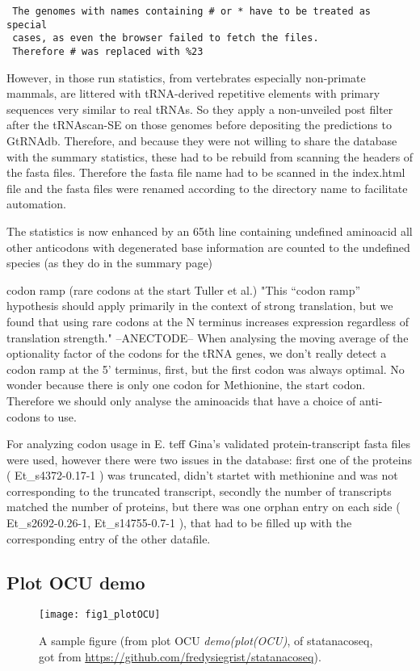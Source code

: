 \begin{verbatim}
 The genomes with names containing # or * have to be treated as special 
 cases, as even the browser failed to fetch the files. 
 Therefore # was replaced with %23
\end{verbatim}

However, in those run statistics, from vertebrates especially non-primate mammals, are littered with tRNA-derived repetitive elements with primary sequences very similar to real tRNAs. So they apply a non-unveiled post filter after the tRNAscan-SE on those genomes before depositing the predictions to GtRNAdb. Therefore, and because they were not willing to share the database with the summary statistics, these had to be rebuild from scanning the headers of the fasta files. Therefore the fasta file name had to be scanned in the index.html file and the fasta files were renamed according to the directory name to facilitate automation. 

The statistics is now enhanced by an 65th line containing undefined aminoacid all other anticodons with degenerated base information are counted to the undefined species (as they do in the summary page)

codon ramp (rare codons at the start Tuller et al.) "This “codon ramp” hypothesis should apply primarily in the context of strong translation, but we found that using rare codons at the N terminus increases expression regardless of translation strength." --ANECTODE-- When analysing the moving average of the optionality factor of the codons for the tRNA genes, we don't really detect a codon ramp at the 5' terminus, first, but the first codon was always optimal. No wonder because there is only one codon for Methionine, the start codon. Therefore we should only analyse the aminoacids that have a choice of anti-codons to use.  

For analyzing codon usage in E. teff Gina's validated protein-transcript fasta files were used, however there were two issues in the database: 
first one of the proteins (
Et\_s4372-0.17-1
) was truncated, didn't startet with methionine and was not corresponding to the truncated transcript, secondly the number of transcripts matched the number of proteins, but there was one orphan entry on each side (
Et\_s2692-0.26-1, Et\_s14755-0.7-1
), that had to be filled up with the corresponding entry of the other datafile. 


\subsection{Plot OCU demo}
\begin{figure}[tb] 
\centering 
\texttt{[image: fig1\_plotOCU]} 
\caption[A sample figure from demo plotOCU]{A sample figure (from plot OCU \emph{demo(plot(OCU)}, of statanacoseq, got from \url{https://github.com/fredysiegrist/statanacoseq}).}
\label{fig:plotOCU} 
\end{figure}
